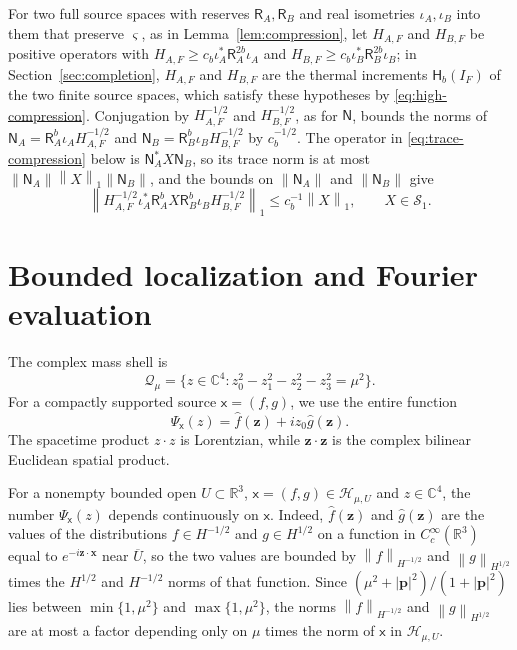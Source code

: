 \documentclass[11pt]{amsart}
\numberwithin{equation}{section}
\theoremstyle{definition}
\newcommand{\R}{\mathbb R}
\newcommand{\C}{\mathbb C}
\newcommand{\Hh}{\mathcal H}
\newcommand{\Sc}{\mathcal S}
\newcommand{\Res}{\mathsf R}
\newcommand{\Therm}{\mathsf H}
\newcommand{\sx}{\mathsf x}
\newcommand{\bx}{\mathbf x}
\newcommand{\bp}{\mathbf p}
\newcommand{\bz}{\mathbf z}
\newcommand{\norm}[1]{\left\|#1\right\|}
\newcommand{\wh}[1]{\widehat{#1}}
\begin{document}
For two full source spaces with reserves \(\Res_A,\Res_B\) and real
isometries \(\iota_A,\iota_B\) into them that preserve \(\varsigma\), as in
Lemma~\ref{lem:compression},
let \(H_{A,F}\) and \(H_{B,F}\) be positive operators with
\(H_{A,F}\ge c_b\iota_A^*\Res_A^{2b}\iota_A\) and
\(H_{B,F}\ge c_b\iota_B^*\Res_B^{2b}\iota_B\); in
Section~\ref{sec:completion}, \(H_{A,F}\) and \(H_{B,F}\) are the
thermal increments \(\Therm_b(I_F)\) of the two finite source spaces,
which satisfy these hypotheses by \eqref{eq:high-compression}.
Conjugation by \(H_{A,F}^{-1/2}\) and \(H_{B,F}^{-1/2}\), as for
\(\mathsf N\), bounds the norms of
\(\mathsf N_A=\Res_A^b\iota_AH_{A,F}^{-1/2}\) and
\(\mathsf N_B=\Res_B^b\iota_BH_{B,F}^{-1/2}\) by \(c_b^{-1/2}\). The
operator in \eqref{eq:trace-compression} below is
\(\mathsf N_A^*X\mathsf N_B\), so its trace norm is at most
\(\norm{\mathsf N_A}\norm{X}_1\norm{\mathsf N_B}\), and the bounds on
\(\norm{\mathsf N_A}\) and \(\norm{\mathsf N_B}\) give
\begin{equation}
 \norm{
 H_{A,F}^{-1/2}\iota_A^*\Res_A^bX\Res_B^b\iota_BH_{B,F}^{-1/2}
 }_1
 \le c_b^{-1}\norm{X}_1,
 \qquad X\in\Sc_1.
 \label{eq:trace-compression}
\end{equation}

\section{Bounded localization and Fourier evaluation}
\label{sec:evaluation}

The complex mass shell is
\[
 \mathcal Q_\mu
 =\{z\in\C^4:z_0^2-z_1^2-z_2^2-z_3^2=\mu^2\}.
\]
For a compactly supported source \(\sx=(f,g)\), we use the entire
function
\[
 \Psi_\sx(z)=\wh f(\bz)+iz_0\wh g(\bz).
\]
The spacetime product \(z\cdot z\) is Lorentzian, while
\(\bz\cdot\bz\) is the complex bilinear Euclidean spatial product.

For a nonempty bounded open \(U\subset\R^3\), \(\sx=(f,g)\in\Hh_{\mu,U}\)
and \(z\in\C^4\), the number \(\Psi_\sx(z)\) depends continuously on
\(\sx\). Indeed, \(\wh f(\bz)\) and \(\wh g(\bz)\) are the values of the
distributions \(f\in H^{-1/2}\) and \(g\in H^{1/2}\) on a function in
\(C_c^\infty(\R^3)\) equal to \(e^{-i\bz\cdot\bx}\) near \(\overline U\), so
the two values are bounded by \(\norm{f}_{H^{-1/2}}\) and \(\norm{g}_{H^{1/2}}\) times
the \(H^{1/2}\) and \(H^{-1/2}\) norms of that function. Since
\((\mu^2+|\bp|^2)/(1+|\bp|^2)\) lies between \(\min\{1,\mu^2\}\) and
\(\max\{1,\mu^2\}\), the norms \(\norm{f}_{H^{-1/2}}\) and
\(\norm{g}_{H^{1/2}}\) are at most a factor depending only on \(\mu\) times
the norm of \(\sx\) in \(\Hh_{\mu,U}\).
\end{document}
